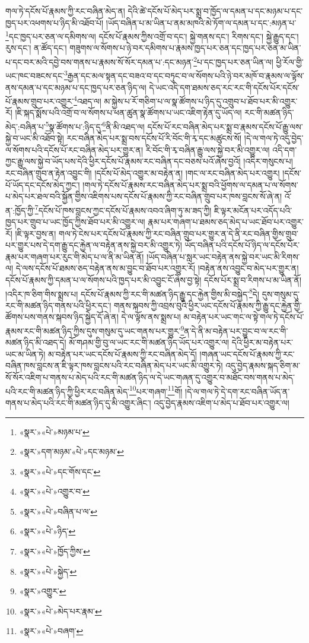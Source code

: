 གལ་ཏེ་དངོས་པོ་རྣམས་ཀྱི་རང་བཞིན་མེད་ན། དེའི་ཚེ་དངོས་པོ་མེད་པར་སྨྲ་བ་ཁྱོད་ལ་དམན་པ་དང་མཉམ་པ་དང་ཁྱད་པར་འཕགས་པ་ཉིད་མི་འཐོབ་པོ། །ཡོད་བཞིན་པ་མ་ཡིན་པ་ནམ་མཁའི་མེ་ཏོག་ལ་དམན་པ་དང་:མཉན་པ་\footnote{«སྣར་»«པེ་»མཉམ་པ་}དང་ཁྱད་པར་ཅན་ལ་དམིགས་ལ། དངོས་པོ་རྣམས་ཀྱིས་འགྲོ་བ་དང་། སྐྱེ་གནས་དང་། རིགས་དང་། སྐྱེ་རྒྱུད་དང་། རུས་དང་། ན་ཚོད་དང་། གཟུགས་ལ་སོགས་པ་ཉེ་བར་དམིགས་པ་རྣམས་ཁྱད་པར་ཅན་དང་ཁྱད་པར་ཅན་མ་ཡིན་པ་དང་བར་མའི་དབྱེ་བས་གནས་པ་རྣམས་སོ་སོར་དམན་པ་:དང་མཉན་\footnote{«སྣར་»དག་མཉམ་«པེ་»དང་མཉམ་}པ་དང་ཁྱད་པར་ཅན་ཡིན་ལ། ཕྱི་རོལ་གྱི་ཡང་ཁང་བཟངས་དང་\footnote{«སྣར་»«པེ་»དང་གོས་དང་}རྒྱན་དང་མལ་སྟན་དང་བཟའ་བ་དང་བཏུང་བ་ལ་སོགས་པའི་ཉེ་བར་མཁོ་བ་རྣམས་ལ་ལྟོས་ནས་དམན་པ་དང་མཉམ་པ་དང་ཁྱད་པར་ཅན་ཉིད་ལ། དེ་ཡང་འདི་དག་ཐམས་ཅད་རང་རང་གི་དངོས་པོར་དངོས་པོ་རྣམས་གྲུབ་པར་འགྱུར་\footnote{«སྣར་»«པེ་»འགྱུར་བ་}འཐད་ལ། མ་སྐྱེས་པ་རོ་གཅིག་པ་ལ་སྣ་ཚོགས་པ་ཉིད་དུ་འགྲུབ་པ་ཐོབ་པར་མི་འགྱུར་རོ། །ཇི་སྐད་སྨོས་པའི་འགྲོ་བ་ལ་སོགས་པ་ཕན་ཚུན་སྣ་ཚོགས་པ་ཡང་འཇིག་རྟེན་དུ་ཡོད་ལ། རང་གི་མཚན་ཉིད་མེད་:བཞིན་པ་\footnote{«སྣར་»«པེ་»བཞིན་པ་ལ་}སྣ་ཚོགས་པ་:ཉིད་དུ་\footnote{«སྣར་»«པེ་»ཉིད་}ནི་མི་འཐད་ལ། དངོས་པོ་རང་བཞིན་མེད་པར་སྨྲ་བ་རྣམས་དངོས་པོ་རྒྱུ་ལས་སྐྱེ་བ་ཡང་མི་འཐོབ་སྟེ། རང་བཞིན་མེད་པར་སྨྲ་བས་དངོས་པོ་རི་བོང་གི་རྭ་དང་མཚུངས་སོ། །དེ་ལ་གལ་ཏེ་འདུ་བྱེད་ལ་སོགས་པའི་དངོས་པོ་རང་བཞིན་མེད་པར་གྱུར་ན། རི་བོང་གི་རྭ་བཞིན་རྒྱུ་ལས་སྐྱེ་བར་མི་འགྱུར་ལ། འདི་དག་ཀྱང་རྒྱུ་ལས་སྐྱེ་བ་ཡོད་པས་དེའི་ཕྱིར་དངོས་པོ་རྣམས་རང་བཞིན་དང་བཅས་པའོ་ཞེས་བྱའོ། །འདིར་གསུངས་པ། རང་བཞིན་གྲུབ་ན་རྟེན་འབྱུང་གི། །དངོས་པོ་མེད་འགྱུར་མ་བརྟེན་ན། །གང་ལ་རང་བཞིན་མེད་པར་འགྱུར། །དངོས་པོ་ཡོད་དང་དངོས་མེད་ཀྱང་། །གལ་ཏེ་དངོས་པོ་རྣམས་རང་བཞིན་མེད་པར་སྨྲ་བའི་ཕྱོགས་ལ་དམན་པ་ལ་སོགས་པ་མེད་པར་ཐལ་བའི་སྐྱོན་གྱིས་འཇིགས་པས་དངོས་པོ་རྣམས་ཀྱི་རང་བཞིན་གྲུབ་པར་ཁས་བླངས་སོ་ཞེ་ན། འོ་ན་:ཁྱོད་ཀྱི་\footnote{«སྣར་»«པེ་»ཁྱོད་ཀྱིས་}དངོས་པོ་ཁས་བླངས་ཀྱང་དངོས་པོ་རྣམས་འབའ་ཞིག་ཏུ་མ་ཟད་ཀྱི། ཇི་ལྟར་མངོན་པར་འདོད་པའི་ཁྱད་པར་གྲུབ་པ་ཡང་ཁྱོད་ཀྱིས་ཐོབ་པར་མི་འགྱུར་ལ། རྣམ་པར་གཞག་པ་ཐམས་ཅད་མེད་པ་ཡང་ཐོབ་པར་འགྱུར་རོ། །ཇི་ལྟར་བྱས་ན། གལ་ཏེ་ངེས་པར་དངོས་པོ་རྣམས་ཀྱི་རང་བཞིན་གྲུབ་པར་གྱུར་ན་དེ་ནི་རང་བཞིན་གྱིས་གྲུབ་པར་གྱུར་པས་དེ་དག་རྒྱུ་དང་རྐྱེན་ལ་བརྟེན་ནས་སྐྱེ་བར་མི་འགྱུར་ཏེ། ཡོད་བཞིན་པའི་དངོས་པོ་ཉིད་ལ་དངོས་པོར་རྣམ་པར་གཞག་པར་རུང་གི་མེད་པ་ལ་ནི་མ་ཡིན་ནོ། །ཡོད་བཞིན་པ་སླར་ཡང་བརྟེན་ནས་སྐྱེ་བར་ཡང་མི་རིགས་ལ། དེ་ལས་དངོས་པོ་ཐམས་ཅད་བརྟེན་ནས་མ་བྱུང་བ་ཐོབ་པར་འགྱུར་རོ། །བརྟེན་ནས་འབྱུང་བ་མེད་པར་གྱུར་ན། དངོས་པོ་རྣམས་ཀྱི་དམན་པ་ལ་སོགས་པའི་ཁྱད་པར་མི་འབྱུང་ངོ་ཞེས་བྱ་སྟེ། དངོས་པོར་སྨྲ་བ་རིགས་པ་མ་ཡིན་ནོ། །འདིར་ཁ་ཅིག་གིས་སྨྲས་པ། དངོས་པོ་རྣམས་ཀྱི་རང་གི་མཚན་ཉིད་རྒྱུ་དང་རྐྱེན་གྱིས་མི་བསྐྱེད་\footnote{«སྣར་»«པེ་»སྐྱེད་}དེ། དུས་གསུམ་དུ་རང་གི་མཚན་ཉིད་གནས་པའི་ཕྱིར་དང་། གནས་སྐབས་ཀྱི་འབྲས་བུའི་ཕྱིར་ཡང་དངོས་པོ་རྣམས་ཀྱི་རྒྱུ་དང་རྐྱེན་གྱི་ཚོགས་པས་གནས་སྐབས་ཉིད་སྐྱེད་དོ་ཞེ་ན། དེ་ལ་ལྟོས་ནས་སྨྲས་པ། མ་བརྟེན་པར་ཡང་གང་ལ་སྟེ་གལ་ཏེ་དངོས་པོ་རྣམས་རང་གི་མཚན་ཉིད་ཀྱིས་དུས་གསུམ་དུ་ཡང་གནས་པར་གྱུར་\footnote{«སྣར་»འགྱུར་}ན་དེ་ནི་མ་བརྟེན་པར་བྱུང་བ་ལ་རང་གི་མཚན་ཉིད་མི་འཐད་དེ། མོ་གཤམ་གྱི་བུ་ལ་ཡང་རང་གི་མཚན་ཉིད་ཡོད་པར་འགྱུར་ལ། དེའི་ཕྱིར་མ་བརྟེན་པར་ཡང་མ་ཡིན་ཏེ། མ་བརྟེན་པར་ཡང་དངོས་པོ་རྣམས་ཀྱི་རང་བཞིན་མེད་དོ། །གཞན་ཡང་དངོས་པོ་རྣམས་ཀྱི་རང་བཞིན་ཁས་བླངས་ན་ཇི་ལྟར་ཁས་བླངས་པའི་རང་བཞིན་མེད་པར་ཡང་མི་འགྱུར་ཏེ། འདུ་བྱེད་རྣམས་སྐད་ཅིག་མ་སོ་སོར་འཇིག་པ་གནས་པ་མེད་པའི་རང་གི་མཚན་ཉིད་ལ་དེ་ཡང་གཞན་དུ་འགྱུར་བ་མཐོང་བས་གནས་པ་མེད་པའི་རང་གི་མཚན་ཉིད་ཀྱི་ཕྱིར་རང་བཞིན་མེད་\footnote{«སྣར་»«པེ་»མེད་པར་རྣམ་}པར་གཞག་\footnote{«སྣར་»«པེ་»བཞག་}གོ། །དེ་ལ་གལ་ཏེ་དེ་དག་རང་བཞིན་ཡོད་ན་གནས་པ་མེད་པའི་རང་གི་མཚན་ཉིད་དུ་མི་འགྱུར་ཞིང་། འདུ་བྱེད་རྣམས་འཇིག་པ་མེད་པ་ཐོབ་པར་འགྱུར་ལ། 